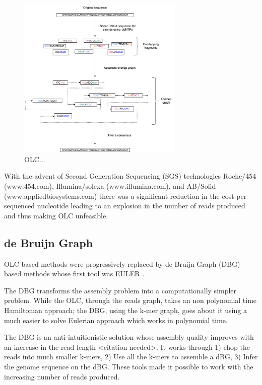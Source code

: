 \documentclass[11pt]{article}
\begin{document}
\begin{figure}[H]
\centering
\includegraphics[width=0.7\textwidth]{./figures/OLC framework.png}
\caption{OLC...}
\end{figure}

With the advent of Second Generation Sequencing (SGS) technologies 
Roche/454 (www.454.com), Illumina/solexa (www.illumina.com),
and AB/Solid (www.appliedbiosystems.com) there was a significant reduction in 
the cost per sequenced nucleotide \cite{liComparisonTwoMajor2012} leading to an 
explosion in the number of reads produced and thus making OLC unfeasible. 

\subsection{de Bruijn Graph}
\label{sec:org2326135}
OLC based methods were progressively replaced by de Bruijn Graph (DBG)
\cite{iduryNewAlgorithmDNA1995} based methods whose first tool was EULER
\cite{pevznerEulerianPathApproach2001}.

The DBG transforms the assembly problem into a computationally simpler problem.
While the OLC, through the reads graph, takes an non polynomial time Hamiltonian 
approach; the DBG, using the k-mer graph, goes about it using a much easier to
solve Eulerian approach which works in polynomial time.
\cite{liComparisonTwoMajor2012,pevznerEulerianPathApproach2001} 

The DBG is an anti-intuitionistic solution whose assembly quality improves with 
an increase in the read length <citation needed>. It works through 1) chop the reads into
much smaller k-mers, 2) Use all the k-mers to assemble a dBG, 3) Infer the 
genome sequence on the dBG. These tools made it possible to work with the 
increasing number of reads produced. 
\end{document}
